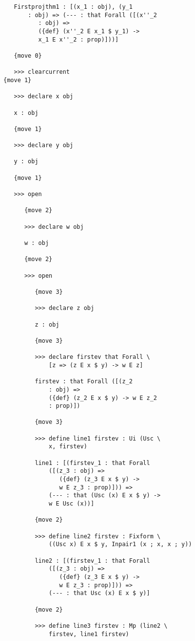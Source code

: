 \documentclass[12pt]{article}
\begin{document}
\begin{verbatim}
   Firstprojthm1 : [(x_1 : obj), (y_1 
       : obj) => (--- : that Forall ([(x''_2 
          : obj) => 
          ({def} (x''_2 E x_1 $ y_1) -> 
          x_1 E x''_2 : prop)]))]

   {move 0}

   >>> clearcurrent
{move 1}

   >>> declare x obj

   x : obj

   {move 1}

   >>> declare y obj

   y : obj

   {move 1}

   >>> open

      {move 2}

      >>> declare w obj

      w : obj

      {move 2}

      >>> open

         {move 3}

         >>> declare z obj

         z : obj

         {move 3}

         >>> declare firstev that Forall \
             [z => (z E x $ y) -> w E z]

         firstev : that Forall ([(z_2 
             : obj) => 
             ({def} (z_2 E x $ y) -> w E z_2 
             : prop)])

         {move 3}

         >>> define line1 firstev : Ui (Usc \
             x, firstev)

         line1 : [(firstev_1 : that Forall 
             ([(z_3 : obj) => 
                ({def} (z_3 E x $ y) -> 
                w E z_3 : prop)])) => 
             (--- : that (Usc (x) E x $ y) -> 
             w E Usc (x))]

         {move 2}

         >>> define line2 firstev : Fixform \
             ((Usc x) E x $ y, Inpair1 (x ; x, x ; y))

         line2 : [(firstev_1 : that Forall 
             ([(z_3 : obj) => 
                ({def} (z_3 E x $ y) -> 
                w E z_3 : prop)])) => 
             (--- : that Usc (x) E x $ y)]

         {move 2}

         >>> define line3 firstev : Mp (line2 \
             firstev, line1 firstev)


\end{verbatim}
\end{document}
